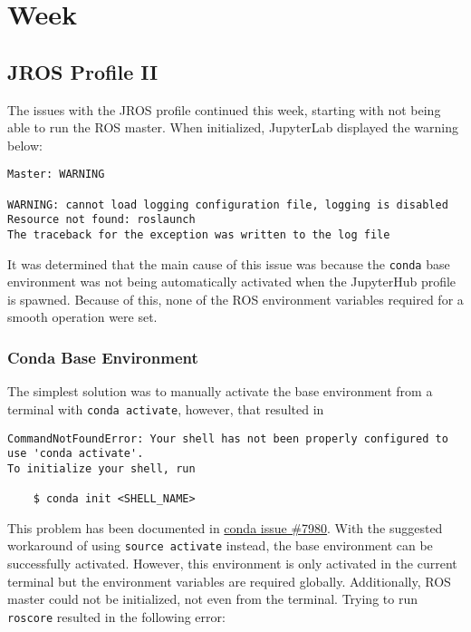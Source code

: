 \chapter{Week}

\section{JROS Profile II}

    The issues with the JROS profile continued this week, starting with not being able to run the ROS master. When initialized, JupyterLab displayed the warning below: 


    \begin{lstlisting}[language=warning]
Master: WARNING

WARNING: cannot load logging configuration file, logging is disabled
Resource not found: roslaunch
The traceback for the exception was written to the log file     
    \end{lstlisting}

    \noindent It was determined that the main cause of this issue was because the \texttt{conda} base environment was not being automatically activated when the JupyterHub profile is spawned. Because of this, none of the ROS environment variables required for a smooth operation were set.

    \subsection{Conda Base Environment}

    The simplest solution was to manually activate the base environment from a terminal with \texttt{conda activate}, however, that resulted in

    \begin{lstlisting}[language=error]
CommandNotFoundError: Your shell has not been properly configured to use 'conda activate'.
To initialize your shell, run

    $ conda init <SHELL_NAME>
    \end{lstlisting}




    \noindent This problem has been documented in \href{https://github.com/conda/conda/issues/7980}{conda issue \#7980}. With the suggested workaround of using \texttt{source activate} instead, the base environment can be successfully activated. However, this environment is only activated in the current terminal but the environment variables are required globally. Additionally, ROS master could not be initialized, not even from the terminal. Trying to run \texttt{roscore} resulted in the following error:

